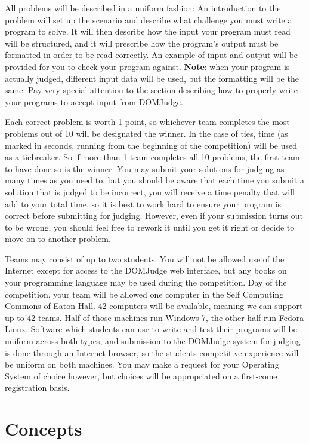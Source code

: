 \documentclass[a4paper]{article}
\begin{document}
All problems will be described in a uniform fashion: An introduction to the problem will set up the scenario and describe what challenge you must write a program to solve. It will then describe how the input your program must read will be structured, and it will prescribe how the program's output must be formatted in order to be read correctly. An example of input and output will be provided for you to check your program against. \textbf{Note}: when your program is actually judged, different input data will be used, but the formatting will be the same. Pay very special attention to the section describing how to properly write your programs to accept input from DOMJudge.

Each correct problem is worth 1 point, so whichever team completes the most problems out of 10 will be designated the winner. In the case of ties, time (as marked in seconds, running from the beginning of the competition) will be used as a tiebreaker. So if more than 1 team completes all 10 problems, the first team to have done so is the winner. You may submit your solutions for judging as many times as you need to, but you should be aware that each time you submit a solution that is judged to be incorrect, you will receive a time penalty that will add to your total time, so it is best to work hard to ensure your program is correct before submitting for judging. However, even if your submission turns out to be wrong, you should feel free to rework it until you get it right or decide to move on to another problem. 

Teams may consist of up to two students. You will not be allowed use of the Internet except for access to the DOMJudge web interface, but any books on your programming language may be used during the competition. Day of the competition, your team will be allowed one computer in the Self Computing Commons of Eaton Hall. 42 computers will be available, meaning we can support up to 42 teams. Half of those machines run Windows 7, the other half run Fedora Linux. Software which students can use to write and test their programs will be uniform across both types, and submission to the DOMJudge system for judging is done through an Internet browser, so the students competitive experience will be uniform on both machines. You may make a request for your Operating System of choice however, but choices will be appropriated on a first-come registration basis.

\newpage

\section{Concepts}
\end{document}
